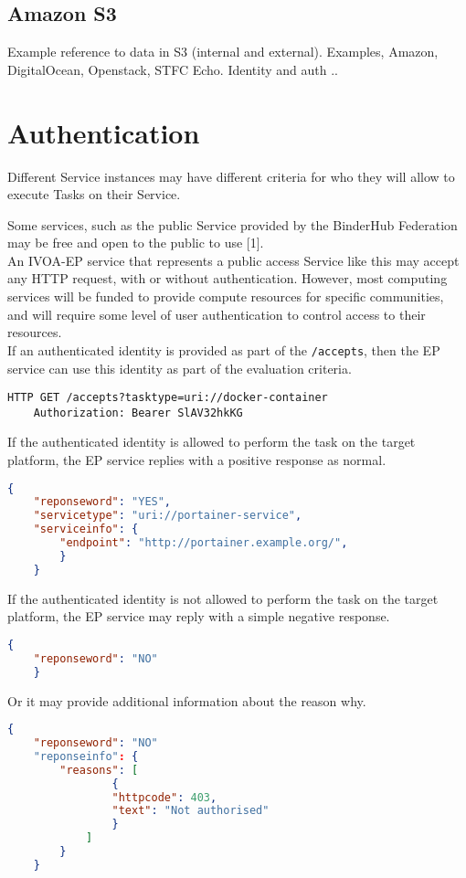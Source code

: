 \documentclass[11pt,a4paper]{ivoa}
\newcommand{\ivoep} {IVOA-EP\xspace}
\newcommand{\codeword}[1] {\texttt{#1}}
\begin{document}
\subsection{Amazon S3}
\label{sec:data-access-amazons3}

Example reference to data in S3 (internal and external).
Examples, Amazon, DigitalOcean, Openstack, STFC Echo.
Identity and auth ..


\section{Authentication}
\label{sec:authentication}
Different Service instances may have different criteria for who they will allow to execute Tasks on their Service.

Some services, such as the public Service provided by the BinderHub Federation may be free and open to the public to use [1].
\\
An \ivoep service that represents a public access Service like this may accept any HTTP request, with or without authentication.
However, most computing services will be funded to provide compute resources for specific communities, and will require some level of user authentication to control access to their resources.
\\
If an authenticated identity is provided as part of the \codeword{/accepts}, then the EP service can use this identity as part of the evaluation criteria.
\begin{lstlisting}[]
    HTTP GET /accepts?tasktype=uri://docker-container
    Authorization: Bearer SlAV32hkKG
\end{lstlisting}

If the authenticated identity is allowed to perform the task on the target platform, the EP service replies with a positive
response as normal.
\begin{lstlisting}[language=json]
    {
    "reponseword": "YES",
    "servicetype": "uri://portainer-service",
    "serviceinfo": {
        "endpoint": "http://portainer.example.org/",
        }
    }
\end{lstlisting}

If the authenticated identity is not allowed to perform the task on the target platform, the EP service may
reply with a simple negative response.
\begin{lstlisting}[language=json]
    {
    "reponseword": "NO"
    }
\end{lstlisting}
Or it may provide additional information about the reason why.
\begin{lstlisting}[language=json]
    {
    "reponseword": "NO"
    "reponseinfo": {
        "reasons": [
                {
                "httpcode": 403,
                "text": "Not authorised"
                }
            ]
        }
    }
\end{lstlisting}
\end{document}
